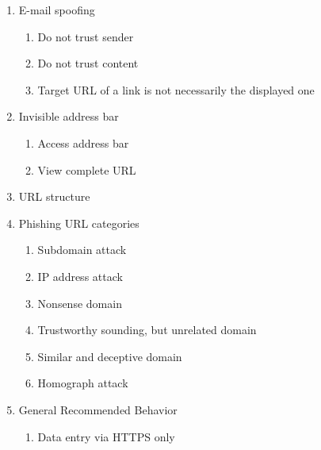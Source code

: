 \begin{enumerate}
	\item E-mail spoofing 
	\begin{enumerate}
		\item Do not trust sender
		\item Do not trust content
		\item Target URL of a link is not necessarily the displayed one
	\end{enumerate}
	\item Invisible address bar
	\begin{enumerate}
		\item Access address bar
		\item View complete URL
	\end{enumerate}
	\item URL structure
	\item Phishing URL categories
	\begin{enumerate}
		\item Subdomain attack
		\item IP address attack
		\item Nonsense domain
		\item Trustworthy sounding, but unrelated domain
		\item Similar and deceptive domain
		\item Homograph attack
	\end{enumerate}
	\item General Recommended Behavior
	\begin{enumerate}
		\item Data entry via HTTPS only
	\end{enumerate}
	
\end{enumerate}
